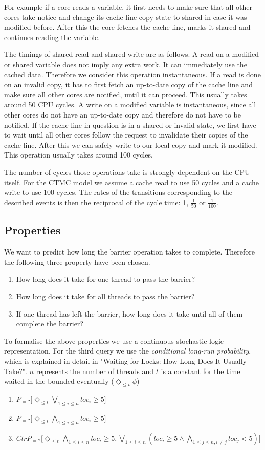 \documentclass[a4paper, 10pt]{article}
\begin{document}
For example if a core reads a variable, it first needs to make sure that all other cores take notice and change its cache line copy state to shared in case it was modified before. After this the core fetches the cache line, marks it shared and continues reading the variable.

The timings of shared read and shared write are as follows. A read on a modified or shared variable does not imply any extra work. It can immediately use the cached data. Therefore we consider this operation instantaneous. If a read is done on an invalid copy, it has to first fetch an up-to-date copy of the cache line and make sure all other cores are notified, until it can proceed. This usually takes around 50 CPU cycles. A write on a modified variable is instantaneous, since all other cores do not have an up-to-date copy and therefore do not have to be notified. If the cache line in question is in a shared or invalid state, we first have to wait until all other cores follow the request to invalidate their copies of the  cache line. After this we can safely write to our local copy and mark it modified. This operation usually takes around 100 cycles. 

The number of cycles those operations take is strongly dependent on the CPU itself. For the CTMC model we assume a cache read to use 50 cycles and a cache write to use 100 cycles. The rates of the transitions corresponding to the described events is then the reciprocal of the cycle time: 1, $\frac{1}{50}$ or $\frac{1}{100}$.
\subsection{Properties}
We want to predict how long the barrier operation takes to complete. Therefore the following three property have been chosen.
\begin{enumerate}
	\item How long does it take for one thread to pass the barrier?
	\item How long does it take for all threads to pass the barrier?
	\item If one thread has left the barrier, how long does it take until all of them complete the barrier?
\end{enumerate}

To formalise the above properties we use a continuous stochastic logic\cite{assb96}\cite{bkh99} representation. For the third query we use the \emph{conditional long-run probability}, which is explained in detail in "Waiting for Locks: How Long Does It Usually Take?"\cite{fmix}. $n$ represents the number of threads and $t$ is a constant for the time waited in the bounded eventually ($\Diamond_{\le t} \phi$)
\begin{enumerate}
	\item $P_{=?} \big[\Diamond_{\le t} \bigvee_{1 \le i \le n} loc_i \ge 5\big]$
	\item $P_{=?} \big[\Diamond_{\le t} \bigwedge_{1 \le i \le n} loc_i \ge 5\big]$
	\item $ClrP_{=?} \big[\Diamond_{\le t} \bigwedge_{1 \le i \le n} loc_i \ge 5, \bigvee_{1 \le i \le n} (loc_i \ge 5 \wedge \bigwedge_{1 \le j \le n, i \neq j} loc_j < 5)\big]$
\end{enumerate}
\end{document}
